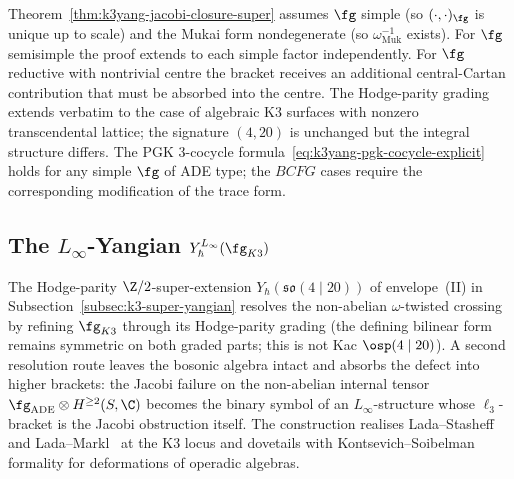 \begin{remark}
\label{rem:k3yang-jacobi-scope}
Theorem~\ref{thm:k3yang-jacobi-closure-super} assumes $\fg$ simple
(so $(\cdot, \cdot)_{\fg}$ is unique up to scale) and the Mukai
form nondegenerate (so $\omega_{\mathrm{Muk}}^{-1}$ exists).
For $\fg$ semisimple the proof extends to each simple factor
independently. For $\fg$ reductive with nontrivial centre the
bracket receives an additional central-Cartan contribution that
must be absorbed into the centre. The Hodge-parity grading
extends verbatim to the case of algebraic K3 surfaces with nonzero
transcendental lattice; the signature $(4, 20)$ is unchanged but
the integral structure differs. The PGK $3$-cocycle
formula~\eqref{eq:k3yang-pgk-cocycle-explicit} holds for any
simple $\fg$ of ADE type; the $BCFG$ cases require the
corresponding modification of the trace form.
\end{remark}



\subsection{The \texorpdfstring{$L_\infty$}{L-inf}-Yangian \texorpdfstring{$Y_\hbar^{L_\infty}(\fg_{K3})$}{Y-hbar-L-inf(g-K3)}}
\label{subsec:k3-linfty-yangian}

The Hodge-parity $\Z/2$-super-extension
$Y_\hbar(\mathfrak{so}(4 \mid 20))$ of envelope~(II) in
Subsection~\ref{subsec:k3-super-yangian} resolves the non-abelian
$\omega$-twisted crossing by refining
$\fg_{K3}$ through its Hodge-parity grading (the defining bilinear
form remains symmetric on both graded parts; this is not Kac
$\osp(4 \mid 20)$). A second resolution route leaves the
bosonic algebra intact and absorbs the defect into higher brackets:
the Jacobi failure on the non-abelian internal tensor
$\fg_{\mathrm{ADE}} \otimes H^{\geq 2}(S, \C)$ becomes the
binary symbol of an $L_\infty$-structure whose $\ell_3$-bracket is
the Jacobi obstruction itself. The construction realises
Lada--Stasheff~\cite{LadaStasheff1993} and
Lada--Markl~\cite{LadaMarkl1995} at the K3 locus and dovetails with
Kontsevich--Soibelman~\cite{KontsevichSoibelman2009} formality for
deformations of operadic algebras.

